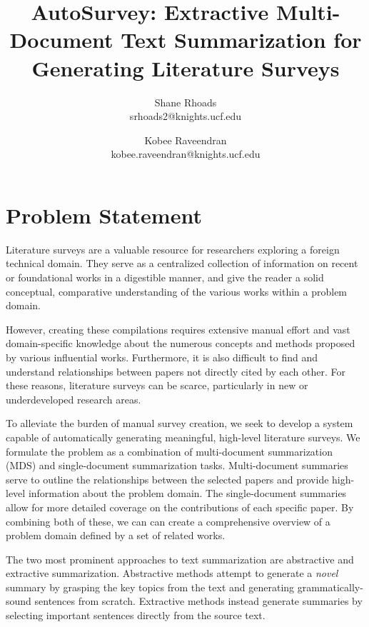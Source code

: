 \documentclass[conference]{sig-alternate-05-2015}
\begin{document}
\title{AutoSurvey: Extractive Multi-Document Text Summarization for Generating Literature Surveys}


\author{Shane Rhoads\\ srhoads2@knights.ucf.edu \and Kobee Raveendran  \\ kobee.raveendran@knights.ucf.edu}

\maketitle

\section{Problem Statement}

Literature surveys are a valuable resource for researchers exploring a foreign technical domain. They serve as a 
centralized collection of information on recent or foundational works in a digestible manner, and give the reader 
a solid conceptual, comparative understanding of the various works within a problem domain. 

However, creating these compilations requires extensive manual effort and vast domain-specific knowledge about the numerous concepts and methods proposed by various influential works. Furthermore, it is also difficult to find and understand relationships between papers not directly cited by each other. For these reasons, literature 
surveys can be scarce, particularly in new or underdeveloped research areas.

To alleviate the burden of manual survey creation, we seek to develop a system capable of automatically generating meaningful, 
high-level literature surveys. We formulate the problem as a combination of multi-document summarization (MDS) and 
single-document summarization tasks. Multi-document summaries serve to outline the relationships between the selected papers and provide high-level information about the problem domain. 
The single-document summaries allow for more detailed 
coverage on the contributions of each specific paper. By combining both of these, we can can create a comprehensive overview of a problem domain defined by a set of related works. %

The two most prominent approaches to text summarization are abstractive and extractive summarization. Abstractive methods attempt to generate a 
\textit{novel} summary by grasping the key topics from the text and generating grammatically-sound sentences from scratch. 
Extractive methods instead generate summaries by selecting important sentences directly from the source text. 
\end{document}
